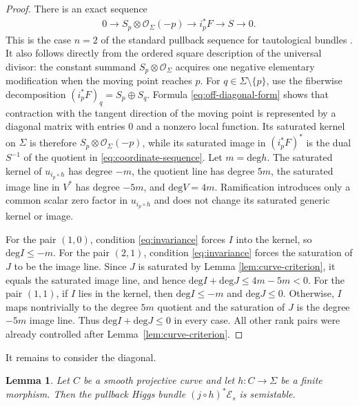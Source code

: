 \documentclass[oneside,11pt]{amsart}
\newtheorem{lem}[thm]{Lemma}
\theoremstyle{definition}
\theoremstyle{remark}
\numberwithin{thm}{section}
\numberwithin{equation}{section}
\begin{document}
\begin{proof}
There is an exact sequence
\begin{align}\label{eq:coordinate-sequence}
 0\longrightarrow S_p\otimes\mathcal{O}_\Sigma(-p)
 \longrightarrow i_p^*F\longrightarrow S\longrightarrow0.
\end{align}
This is the case $n=2$ of the standard pullback sequence for tautological bundles \cite[Proposition~1.5]{Kru20}.  It also follows directly from the ordered square description of the universal divisor: the constant summand $S_p\otimes\mathcal{O}_\Sigma$ acquires one negative elementary modification when the moving point reaches $p$. For $q\in\Sigma\setminus\{p\}$, use the fiberwise decomposition
$(i_p^*F)_q=S_p\oplus S_q$.  Formula \eqref{eq:off-diagonal-form} shows that contraction with the tangent direction of the moving point is represented by a diagonal matrix with entries $0$ and a nonzero local function.  Its saturated kernel on $\Sigma$ is therefore $S_p\otimes\mathcal{O}_\Sigma(-p)$, while its saturated image in $(i_p^*F)^*$ is the dual $S^{-1}$ of the quotient in
\eqref{eq:coordinate-sequence}.
Let $m=\mathrm{deg} h$.  The saturated kernel of $u_{i_p\circ h}$ has degree $-m$, the quotient line has degree $5m$, the saturated image line in $V^*$ has degree $-5m$, and $\mathrm{deg} V=4m$.  Ramification introduces only a common scalar zero factor in $u_{i_p\circ h}$ and does not change its
saturated generic kernel or image.

For the pair $(1,0)$, condition \eqref{eq:invariance} forces $I$ into the kernel, so $\mathrm{deg} I\leq-m$.  For the pair $(2,1)$, condition \eqref{eq:invariance} forces the saturation of $J$ to be the image line.  Since $J$ is saturated by Lemma \ref{lem:curve-criterion}, it equals the saturated image line, and hence $\mathrm{deg} I+\mathrm{deg} J\leq4m-5m<0$. For the pair $(1,1)$, if $I$ lies in the kernel, then $\mathrm{deg} I\leq-m$ and $\mathrm{deg} J\leq0$.  Otherwise, $I$ maps nontrivially to the degree $5m$ quotient and the saturation of $J$ is the degree $-5m$ image line.  Thus $\mathrm{deg} I+\mathrm{deg} J\leq0$ in every case.  All other rank pairs were already controlled after Lemma~\ref{lem:curve-criterion}.
\end{proof}

It remains to consider the diagonal.

\begin{lem}\label{lem:diagonal}
Let $C$ be a smooth projective curve and let $h:C\to\Sigma$ be a
finite morphism.  Then the pullback Higgs bundle $(j\circ h)^*\mathcal{E}_s$ is semistable.
\end{lem}
\end{document}
